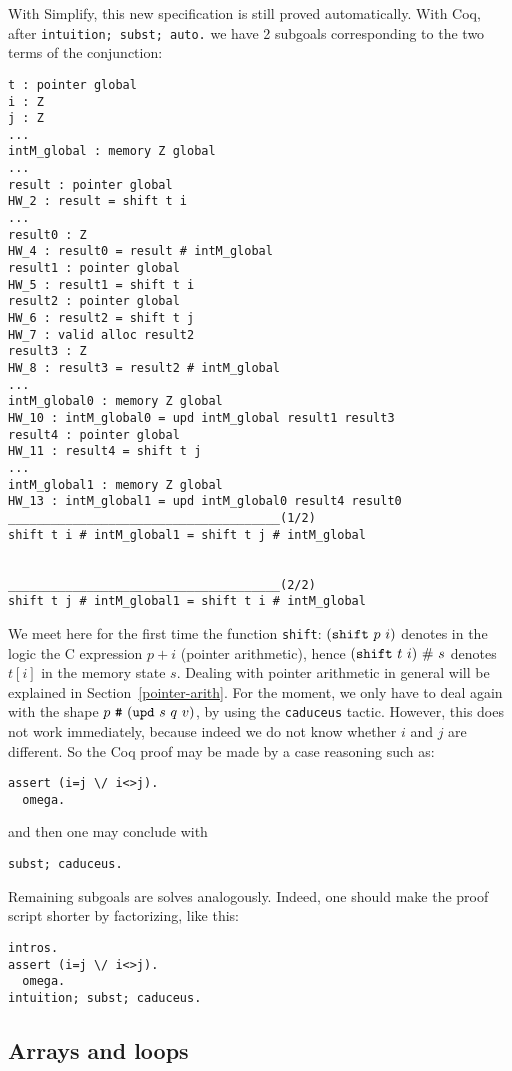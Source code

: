 \documentclass[12pt,a4paper,twoside,openright]{report}
\makeatletter
\newcommand{\indextt}[1]{\index{#1@\texttt{#1}}}
\makeatother
\begin{document}
With Simplify, this new specification is still proved
automatically. With Coq, after \verb|intuition; subst; auto.| we have
2 subgoals corresponding to the two terms of the conjunction:
\indextt{shift}
\begin{verbatim} 
t : pointer global
i : Z
j : Z
...
intM_global : memory Z global
...
result : pointer global
HW_2 : result = shift t i
...
result0 : Z
HW_4 : result0 = result # intM_global
result1 : pointer global
HW_5 : result1 = shift t i
result2 : pointer global
HW_6 : result2 = shift t j
HW_7 : valid alloc result2
result3 : Z
HW_8 : result3 = result2 # intM_global
...
intM_global0 : memory Z global
HW_10 : intM_global0 = upd intM_global result1 result3
result4 : pointer global
HW_11 : result4 = shift t j
...
intM_global1 : memory Z global
HW_13 : intM_global1 = upd intM_global0 result4 result0
______________________________________(1/2)
shift t i # intM_global1 = shift t j # intM_global


______________________________________(2/2)
shift t j # intM_global1 = shift t i # intM_global
\end{verbatim}
We meet here for the first time the function \verb|shift|:
$(\verb|shift|~p~i)$ denotes in the logic the C expression $p+i$
(pointer arithmetic), hence $(\verb|shift|~t~i)~\#~s$ denotes
$t[i]$ in the memory state $s$. Dealing with pointer arithmetic in
general will be explained in Section~\ref{pointer-arith}. For the
moment, we only have to deal again with the shape
$p~\verb|#|~(\verb|upd|~s~q~v)$, by using the \verb|caduceus|
tactic. However, this does not work immediately, because indeed we do
not know whether $i$ and $j$ are different. So the Coq proof may be made by
a case reasoning such as:
\begin{verbatim}
assert (i=j \/ i<>j).
  omega.
\end{verbatim}
and then one may conclude with
\begin{verbatim}
subst; caduceus.
\end{verbatim}
Remaining subgoals are solves analogously. Indeed, one should make the
proof script shorter by factorizing, like this:
\begin{verbatim}
intros.
assert (i=j \/ i<>j).
  omega.
intuition; subst; caduceus.
\end{verbatim}


\subsection{Arrays and loops}
\end{document}
